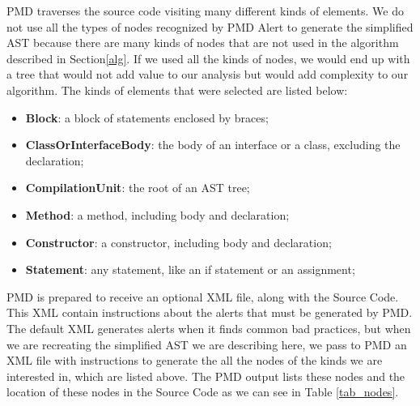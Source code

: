 \documentclass[
]{article}
\begin{document}
PMD traverses the source code visiting many different kinds of elements.
We do not use all the types of nodes recognized by PMD Alert to generate
the simplified AST because there are many kinds of nodes that are not
used in the algorithm described in Section\ref{alg}. If we used all the
kinds of nodes, we would end up with a tree that would not add value to
our analysis but would add complexity to our algorithm. The kinds of
elements that were selected are listed below:

\begin{itemize}


\item \textbf{Block}: a block of statements enclosed by braces;

\item \textbf{ClassOrInterfaceBody}: the body of an interface or a class, excluding the declaration;

\item \textbf{CompilationUnit}: the root of an AST tree;

\item \textbf{Method}: a method, including body and declaration;

\item \textbf{Constructor}: a constructor, including body and declaration;

\item \textbf{Statement}: any statement, like an if statement or an assignment;

\end{itemize}

PMD is prepared to receive an optional XML file, along with the Source
Code. This XML contain instructions about the alerts that must be
generated by PMD. The default XML generates alerts when it finds common
bad practices, but when we are recreating the simplified AST we are
describing here, we pass to PMD an XML file with instructions to
generate the all the nodes of the kinds we are interested in, which are
listed above. The PMD output lists these nodes and the location of these
nodes in the Source Code as we can see in Table \ref{tab_nodes}.

\small
\end{document}
